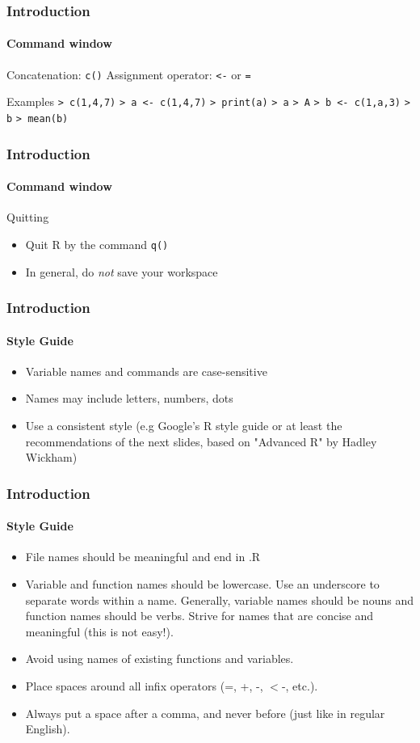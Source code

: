 \documentclass[title={Introduction to R}, author={Mutschler and Zaharieva}, inst={Institute for Econometrics and Empirical Economics}]{beamer}
\begin{document}
\begin{frame}
\frametitle{Introduction}
\framesubtitle{Command window}
Concatenation: \texttt{c()}
Assignment operator: \texttt{<-} or \texttt{=}
\begin{block}{Examples}
\texttt{> c(1,4,7)}\newline
\texttt{> a <- c(1,4,7)}\newline
\texttt{> print(a)}\newline
\texttt{> a}\newline
\texttt{> A}\newline
\texttt{> b <- c(1,a,3)}\newline
\texttt{> b}\newline
\texttt{> mean(b)}
\end{block}
\end{frame}


\begin{frame}
\frametitle{Introduction}
\framesubtitle{Command window}
Quitting
\begin{itemize}
\item Quit R by the command \texttt{q()}
\item In general, do \emph{not }save your workspace
\end{itemize}
\end{frame}


\begin{frame}
	\frametitle{Introduction}
	\framesubtitle{Style Guide}
	\begin{itemize}
		\item Variable names and commands are case-sensitive		
		\item Names may include letters, numbers, dots		
		\item Use a consistent style (e.g Google's R style guide or at least the recommendations of the next slides, based on "Advanced R" by Hadley Wickham)
	\end{itemize}
\end{frame}


\begin{frame}
	\frametitle{Introduction}	
	\framesubtitle{Style Guide}	
	\begin{itemize}
		\item File names should be meaningful and end in .R
		\item Variable and function names should be lowercase. Use an underscore to separate words within a name. Generally, variable names should be nouns and function names should be verbs. Strive for names that are concise and meaningful (this is not easy!). 
		\item Avoid using names of existing functions and variables.
		\item Place spaces around all infix operators (=, +, -, $<$-, etc.).
		\item Always put a space after a comma, and never before (just like in regular English).
	\end{itemize}
\end{frame}
\end{document}
